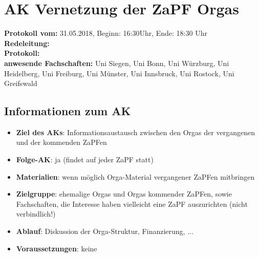 
\section{AK Vernetzung der ZaPF Orgas}

	\textbf{Protokoll vom:} 31.05.2018,
	Beginn: 16:30Uhr,
	Ende: 18:30 Uhr \\
	\textbf{Redeleitung:}  \\ %
	\textbf{Protokoll:}  \\ %
  \textbf{anwesende Fachschaften:} Uni Siegen, Uni Bonn, Uni Würzburg, Uni Heidelberg, Uni Freiburg, Uni Münster, Uni Innsbruck, Uni Rostock, Uni Greifswald

	\subsection*{Informationen zum AK}
		\begin{itemize}
			\item \textbf{Ziel des AKs}: Informationsaustausch zwischen den Orgas der vergangenen und der kommenden ZaPFen
			\item \textbf{Folge-AK}: ja (findet auf jeder ZaPF statt)
      \item \textbf{Materialien}: wenn möglich Orga-Material vergangener ZaPFen mitbringen
			\item \textbf{Zielgruppe}: ehemalige Orgas und Orgas kommender ZaPFen, sowie Fachschaften, die Interesse haben vielleicht eine ZaPF auszurichten (nicht verbindlich!)
			\item \textbf{Ablauf}: Diskussion der Orga-Struktur, Finanzierung, ...
			\item \textbf{Voraussetzungen}: keine
		\end{itemize}

